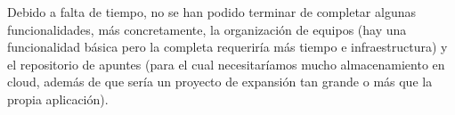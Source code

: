 \documentclass[a4paper,openright,12pt]{article}
\begin{document}
Debido a falta de tiempo, no se han podido terminar de completar algunas funcionalidades, más concretamente, la organización de equipos (hay una funcionalidad básica pero la completa requeriría más tiempo e infraestructura) y el repositorio de apuntes (para el cual necesitaríamos mucho almacenamiento en cloud, además de que sería un proyecto de expansión tan grande o más que la propia aplicación).\newpage



\end{document}
